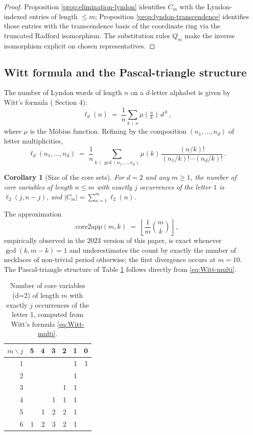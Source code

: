 \documentclass[12pt,english]{article}
\providecommand{\tabularnewline}{\\}
\newtheorem{corollary}[theorem]{Corollary}
\theoremstyle{remark}
\begin{document}
\begin{proof}
Proposition \ref{prop:elimination-lyndon} identifies $C_{m}$ with
the Lyndon-indexed entries of length $\leq m$; Proposition \ref{prop:lyndon-transcendence}
identifies those entries with the transcendence basis of the coordinate
ring via the truncated Radford isomorphism. The substitution rules
$Q_{m}$ make the inverse isomorphism explicit on chosen representatives.
\end{proof}

\subsection{Witt formula and the Pascal-triangle structure\label{subsec:Witt-Pascal}}

The number of Lyndon words of length $n$ on a $d$-letter alphabet
is given by Witt's formula (\cite{Reutenauer} Section 4):
\begin{equation}
\ell_{d}(n)\;=\;\frac{1}{n}\sum_{k\,\mid\,n}\mu\!\left(\tfrac{n}{k}\right)\,d^{\,k}\,,\label{eq:Witt-total}
\end{equation}
where $\mu$ is the Möbius function. Refining by the composition $(n_{1},\ldots,n_{d})$
of letter multiplicities,
\begin{equation}
\ell_{d}(n_{1},\ldots,n_{d})\;=\;\frac{1}{n}\sum_{k\,\mid\,\gcd(n_{1},\ldots,n_{d})}\mu(k)\,\frac{(n/k)!}{(n_{1}/k)!\cdots(n_{d}/k)!}\,.\label{eq:Witt-multi}
\end{equation}

\begin{corollary}[Size of the core sets]
\label{cor:core-size} For $d=2$ and any $m\geq1$, the number of
core variables of length $n\leq m$ with exactly $j$ occurrences
of the letter $1$ is $\ell_{2}(j,n-j)$, and $|C_{m}|=\sum_{n=1}^{m}\ell_{2}(n)$.
\end{corollary}

The approximation
\begin{equation}
\mathrm{core2app}(m,k)\;=\;\left\lfloor \frac{1}{m}\binom{m}{k}\right\rfloor \,,\label{eq:Core2AppMK}
\end{equation}
empirically observed in the 2023 version of this paper, is exact whenever
$\gcd(k,m-k)=1$ and underestimates the count by exactly the number
of necklaces of non-trivial period otherwise; the first divergence
occurs at $m=10$. The Pascal-triangle structure of Table \ref{tab:CoreVarsPascal}
follows directly from \eqref{eq:Witt-multi}.

\begin{table}[H]
\centering
\begin{tabular}{|r|r|r|r|r|r|r|}
\hline
$m\backslash j$ & 5 & 4 & 3 & 2 & 1 & 0\tabularnewline
\hline\hline
1 & & & & & 1 & 1\tabularnewline\hline
2 & & & & & 1 & \tabularnewline\hline
3 & & & & 1 & 1 & \tabularnewline\hline
4 & & & 1 & 1 & 1 & \tabularnewline\hline
5 & & 1 & 2 & 2 & 1 & \tabularnewline\hline
6 & 1 & 2 & 3 & 2 & 1 & \tabularnewline\hline
\end{tabular}
\caption{Number of core variables (d=2) of length $m$ with exactly $j$ occurrences
of the letter 1, computed from Witt's formula \eqref{eq:Witt-multi}.\label{tab:CoreVarsPascal}}
\end{table}
\end{document}

